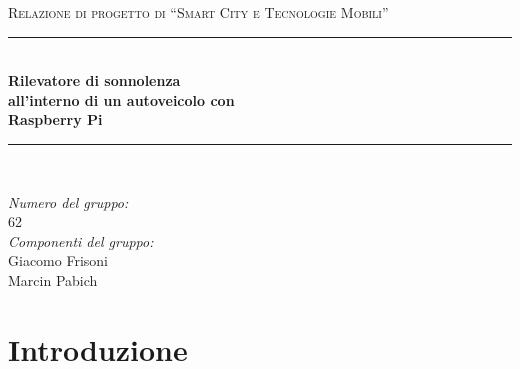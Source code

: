\documentclass[12pt]{article}
\newcommand{\quotes}[1]{``#1''}
\begin{document}

\begin{titlepage}

\newcommand{\HRule}{\rule{\linewidth}{0.5mm}}

\center

\textsc{\Large Relazione di progetto di \quotes{Smart City e Tecnologie Mobili}}\\[0.5cm]

\HRule \\[0.4cm]
{
	\huge \bfseries
	Rilevatore di sonnolenza\\
	all'interno di un autoveicolo con\\
	Raspberry Pi\\[0.4cm]
}
\HRule \\[1.5cm]

\vfill

\begin{flushleft}
\emph{Numero del gruppo:}\\
62\\[1cm]
\emph{Componenti del gruppo:}\\
Giacomo Frisoni\\
Marcin Pabich\\[3cm]
\end{flushleft}



\end{titlepage}


\tableofcontents

\newpage


\section{Introduzione}
\end{document}
